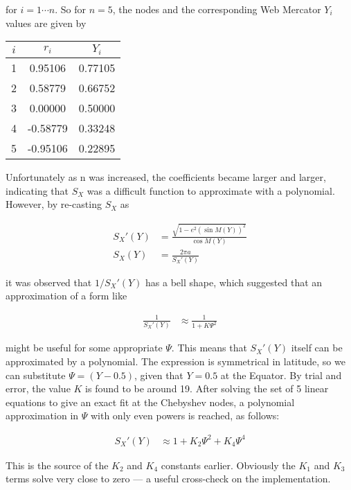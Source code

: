 \documentclass[10pt,a4paper,twocolumn]{article}
\begin{document}
for $i = 1 \cdots n$.  So for $n=5$, the nodes and the corresponding Web
Mercator $Y_i$ values are given by

\begin{table}[h]
  \centering
  \begin{tabular}{c c c}
    \toprule
    $i$ & $r_i$ & $Y_i$ \\
    \midrule
    1 & 0.95106 & 0.77105 \\
    2 & 0.58779 & 0.66752\\
    3 & 0.00000 & 0.50000 \\
    4 & -0.58779 & 0.33248 \\
    5 & -0.95106  & 0.22895 \\
    \bottomrule
  \end{tabular}
\end{table}

Unfortunately as n was increased, the coefficients became larger and larger,
indicating that $S_X$ was a difficult function to approximate with a
polynomial.  However, by re-casting $S_X$ as

\begin{align}
S_X'(Y) & = \frac {\sqrt{1 - e^2 \left(\sin M(Y)\right)^2}}{\cos M(Y)} \\
S_X(Y) & = \frac {2\pi a}{S_X'(Y)}
\end{align}

it was observed that $1/S_X'(Y)$ has a bell shape, which suggested that an
approximation of a form like

\begin{align}
\frac{1}{S_X'(Y)} & \approx \frac{1}{1 + K\Psi^2}
\end{align}

might be useful for some appropriate $\Psi$.  This means that $S_X'(Y)$ itself
can be approximated by a polynomial.  The expression is symmetrical in
latitude, so we can substitute $\Psi = (Y - 0.5)$,  given that $Y = 0.5$ at the
Equator.  By trial and error, the value $K$ is found to be around 19.  After
solving the set of 5 linear equations to give an exact fit at the Chebyshev
nodes, a polynomial approximation in $\Psi$ with only even powers is reached,
as follows:

\begin{align}
S_X'(Y) & \approx 1 + K_2 \Psi^2 + K_4 \Psi^4
\end{align}

This is the source of the $K_2$ and $K_4$ constants earlier.  Obviously the
$K_1$ and $K_3$ terms solve very close to zero --- a useful cross-check on the
implementation.
\end{document}
